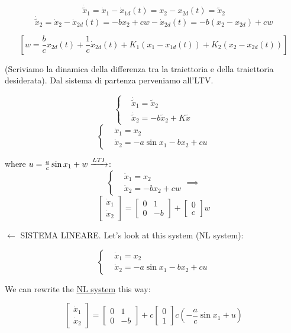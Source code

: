 \[
	\dot{\tilde{x}}_1 = \dot{x}_1 - \dot{x}_{1d}(t) = x_2 - x_{2d}(t) = \tilde{x}_2
\]
\[
	\dot{\tilde{x}}_2 = \dot{x}_2 - \dot{x}_{2d}(t) = -bx_2 + cw - \dot{x}_{2d}(t) = -b(x_2-x_{2d}) + cw
\]

\[
	[w = \frac{b}{c}x_{2d}(t) + \frac{1}{c}\dot{x}_{2d}(t) + K_1(x_1 - x_{1d}(t)) + K_2(x_2-x_{2d}(t))]
\]

(Scriviamo la dinamica della differenza tra la traiettoria e della traiettoria desiderata). Dal sistema di partenza perveniamo all'LTV.

\[
	\left\{
	\begin{aligned}
	&\dot{\tilde{x}}_1 = \tilde{x}_2 \\
	&\dot{\tilde{x}}_2 = -b\tilde{x}_2 + K\tilde{x}
	\end{aligned} 
	\right.
\]
\[
	\left\{
	\begin{aligned}
	&\dot{x}_1 = x_2 \\
	&\dot{x}_2 = -a\sin{x_1} - bx_2 + cu
	\end{aligned} 
	\right.
\]

where $u = \frac{a}{c}\sin{x_1} + w \tendsto{LTI}$:
\[
	\left\{
	\begin{aligned}
	&\dot{x}_1 = x_2 \\
	&\dot{x}_2 = -bx_2 + cw
	\end{aligned}
	\right. \implies
\]
\[
	\begin{bmatrix}\dot{x}_1\\ \dot{x}_2\end{bmatrix} = \begin{bmatrix}0&1\\0&-b\end{bmatrix} + \begin{bmatrix}0\\c\end{bmatrix}w
\]

$\leftarrow$ SISTEMA LINEARE. Let's look at this system (NL system):

\[
	\left\{
	\begin{aligned}
	&\dot{x}_1 = x_2 \\
	&\dot{x}_2 = -a\sin{x_1} -bx_2 + cu
	\end{aligned}
	\right.
\]

We can rewrite the \underline{NL system} this way:

\[
		\begin{bmatrix}\dot{x}_1\\ \dot{x}_2\end{bmatrix} = \begin{bmatrix}0&1\\0&-b\end{bmatrix} + c\begin{bmatrix}0\\1\end{bmatrix}c(-\frac{a}{c}\sin{x_1}+u)
\]

